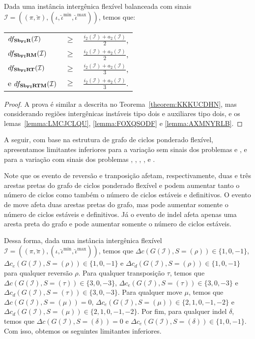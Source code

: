 \begin{theorem}\label{theorem:ZJKGKRKE}
Dada uma instância intergênica flexível balanceada com sinais $\mathcal{I} = ((\pi,\breve\pi),(\iota,\breve\iota^{\min},\breve\iota^{\max}))$, temos que:

\begin{tabular}{lll}
  $df_{\textbf{Sb\textsubscript{FI}R}}(\mathcal{I})$      & $ \ge $ & $\frac{i_2(\mathcal{I}) + a_2(\mathcal{I})}{2}$, \\ 
  $df_{\textbf{Sb\textsubscript{FI}RM}}(\mathcal{I})$     & $ \ge $ & $\frac{i_2(\mathcal{I}) + a_2(\mathcal{I})}{2}$, \\
  $df_{\textbf{Sb\textsubscript{FI}RT}}(\mathcal{I})$     & $ \ge $ & $\frac{i_2(\mathcal{I}) + a_2(\mathcal{I})}{3}$, \\
  e $df_{\textbf{Sb\textsubscript{FI}RTM}}(\mathcal{I})$  & $ \ge $ & $\frac{i_2(\mathcal{I}) + a_2(\mathcal{I})}{3}$. \\
\end{tabular}
\end{theorem}
\begin{proof}
A prova é similar a descrita no Teorema~\ref{theorem:KKKUCDHN}, mas considerando regiões intergênicas instáveis tipo dois e auxiliares tipo dois, e os lemas~\ref{lemma:LMCJCLQU}, \ref{lemma:FOXQSODF} e \ref{lemma:AXMNYRLB}.
\end{proof}

A seguir, com base na estrutura de grafo de ciclos ponderado flexível, apresentamos limitantes inferiores para a variação sem sinais dos problemas \SbFIT{} e \SbFITM{}, e para a variação com sinais dos problemas \SbFIR{}, \SbFIRI{}, \SbFIRM{}, \SbFIRMI{}, \SbFIRT{} e \SbFIRTM{}.

Note que os evento de reversão e tranposição afetam, respectivamente, duas e três arestas pretas do grafo de ciclos ponderado flexível e podem aumentar tanto o número de ciclos como também o número de ciclos estáveis e definitivos. O evento de move afeta duas arestas pretas do grafo, mas pode aumentar somente o número de ciclos estáveis e definitivos. Já o evento de indel afeta apenas uma aresta preta do grafo e pode aumentar somente o número de ciclos estáveis.

Dessa forma, dada uma instância intergênica flexível $\mathcal{I} = ((\pi,\breve\pi),(\iota,\breve\iota^{\min},\breve\iota^{\max}))$, temos que $\Delta c(G(\mathcal{I}), S=(\rho)) \in \{1,0,-1\}$, $\Delta c_e(G(\mathcal{I}), S=(\rho)) \in \{1,0,-1\}$ e $\Delta c_d(G(\mathcal{I}), S=(\rho)) \in \{1,0,-1\}$ para qualquer reversão $\rho$. Para qualquer transposição $\tau$, temos que $\Delta c(G(\mathcal{I}), S=(\tau)) \in \{3,0,-3\}$, $\Delta c_e(G(\mathcal{I}), S=(\tau)) \in \{3,0,-3\}$ e $\Delta c_d(G(\mathcal{I}), S=(\tau)) \in \{3,0,-3\}$. Para qualquer move $\mu$, temos que $\Delta c(G(\mathcal{I}), S=(\mu)) = 0$, $\Delta c_e(G(\mathcal{I}), S=(\mu)) \in \{2,1,0,-1,-2\}$ e $\Delta c_d(G(\mathcal{I}), S=(\mu)) \in \{2,1,0,-1,-2\}$. Por fim, para qualquer indel $\delta$, temos que $\Delta c(G(\mathcal{I}), S=(\delta)) = 0$ e $\Delta c_e(G(\mathcal{I}), S=(\delta)) \in \{1,0,{-1}\}$. Com isso, obtemos os seguintes limitantes inferiores.

